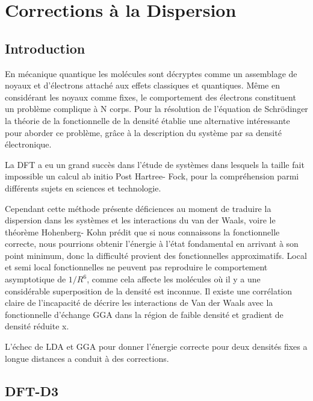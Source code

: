 \chapter[Corrections à la dispersion]{Corrections à la Dispersion}
\minitoc
\restoregeometry

\newpage

	\section*{Introduction}
	
	En mécanique quantique les molécules sont décryptes comme un assemblage de noyaux et d'électrons attaché aux effets classiques et quantiques. Même en considérant les noyaux comme fixes, le comportement des électrons constituent un problème complique à N corps. Pour la résolution de l'équation de Schrödinger la théorie de la fonctionnelle de la densité établie une alternative intéressante pour aborder ce problème, grâce à la description du système par sa densité électronique\cite{adamo2014decrire}.
	
	\bigskip
	La DFT a eu un grand succès dans l'étude de systèmes dans lesquels la taille fait impossible un calcul ab initio Post Hartree- Fock, pour la compréhension parmi différents sujets en sciences et technologie.\cite{}
	\bigskip
	
	Cependant cette méthode présente déficiences au moment de traduire la dispersion dans les systèmes et les interactions du van der Waals, voire le théorème Hohenberg- Kohn prédit que si nous connaissons la fonctionnelle correcte, nous pourrions obtenir l’énergie à l’état fondamental en arrivant à son point minimum, donc la difficulté provient des fonctionnelles approximatifs. Local et semi local fonctionnelles  ne peuvent pas reproduire le comportement asymptotique de $1/R^{6}$, comme cela affecte les molécules où il y a une considérable superposition de la densité est inconnue. Il existe une corrélation claire de l'incapacité de décrire les interactions de Van der Waals avec la fonctionnelle d'échange GGA dans la région de faible densité et gradient de densité réduite x. 
	
	
	L'échec de LDA et GGA pour donner l'énergie correcte pour deux densités fixes a longue distances a conduit à des corrections. 
	
	
	\section{DFT-D3}
	
